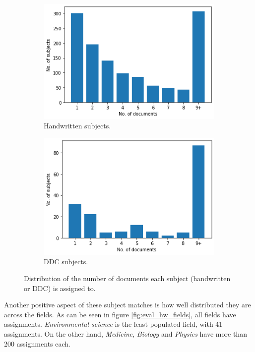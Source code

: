 \begin{figure}
  \begin{subfigure}[t]{0.45\textwidth}
    \centering
    \includegraphics[width=\textwidth]{figures/evaluation/docs_per_subject.png}
    \caption{Handwritten subjects.}
    \label{fig:docs_per_subject}
  \end{subfigure}
  \hfill
  \begin{subfigure}[t]{0.45\textwidth}
    \centering
    \includegraphics[width=\textwidth]{figures/evaluation/docs_per_ddc.png}
    \caption{DDC subjects.}
    \label{fig:docs_per_ddc}
  \end{subfigure}
  \caption{Distribution of the number of documents each subject (handwritten or DDC) is assigned to.}
\end{figure}

Another positive aspect of these subject matches is how well distributed they are across the fields. As can be seen in figure \ref{fig:eval_hw_fields}, all fields have assignments. \textit{Environmental science} is the least populated field, with 41 assignments. On the other hand, \textit{Medicine}, \textit{Biology} and \textit{Physics} have more than 200 assignments each.

